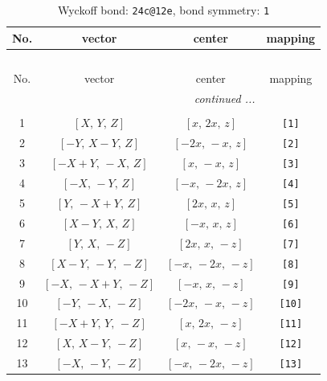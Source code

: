\documentclass[fleqn,8pt]{jsarticle}
\begin{document}
\begin{longtable}{cccc}
\caption{Wyckoff bond: {\tt 24c@12e}, bond symmetry: {\tt 1}}
 \\
 \hline \hline
No. & vector & center & mapping \\ \hline \endfirsthead

\multicolumn{3}{l}{\tablename\ \thetable{}} \\
 \hline \hline
No. & vector & center & mapping \\ \hline \endhead

 \hline \hline
\multicolumn{3}{r}{\footnotesize\it continued ...} \\ \endfoot

 \hline \hline
\multicolumn{3}{r}{} \\ \endlastfoot

1 & $\left[ X,\, Y,\, Z \right]$ & $\left[ x,\, 2 x,\, z \right]$ & {\tt [1]} \\ \hline
2 & $\left[ - Y,\, X - Y,\, Z \right]$ & $\left[ - 2 x,\, - x,\, z \right]$ & {\tt [2]} \\ \hline
3 & $\left[ - X + Y,\, - X,\, Z \right]$ & $\left[ x,\, - x,\, z \right]$ & {\tt [3]} \\ \hline
4 & $\left[ - X,\, - Y,\, Z \right]$ & $\left[ - x,\, - 2 x,\, z \right]$ & {\tt [4]} \\ \hline
5 & $\left[ Y,\, - X + Y,\, Z \right]$ & $\left[ 2 x,\, x,\, z \right]$ & {\tt [5]} \\ \hline
6 & $\left[ X - Y,\, X,\, Z \right]$ & $\left[ - x,\, x,\, z \right]$ & {\tt [6]} \\ \hline
7 & $\left[ Y,\, X,\, - Z \right]$ & $\left[ 2 x,\, x,\, - z \right]$ & {\tt [7]} \\ \hline
8 & $\left[ X - Y,\, - Y,\, - Z \right]$ & $\left[ - x,\, - 2 x,\, - z \right]$ & {\tt [8]} \\ \hline
9 & $\left[ - X,\, - X + Y,\, - Z \right]$ & $\left[ - x,\, x,\, - z \right]$ & {\tt [9]} \\ \hline
10 & $\left[ - Y,\, - X,\, - Z \right]$ & $\left[ - 2 x,\, - x,\, - z \right]$ & {\tt [10]} \\ \hline
11 & $\left[ - X + Y,\, Y,\, - Z \right]$ & $\left[ x,\, 2 x,\, - z \right]$ & {\tt [11]} \\ \hline
12 & $\left[ X,\, X - Y,\, - Z \right]$ & $\left[ x,\, - x,\, - z \right]$ & {\tt [12]} \\ \hline
13 & $\left[ - X,\, - Y,\, - Z \right]$ & $\left[ - x,\, - 2 x,\, - z \right]$ & {\tt [13]} \\ \hline

\end{longtable}
\end{document}
